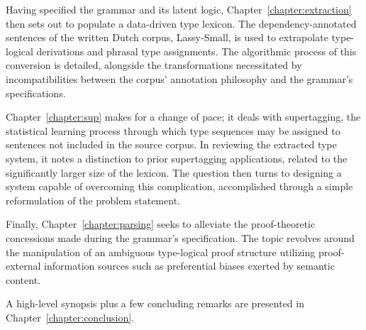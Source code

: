 Having specified the grammar and its latent logic, Chapter~\ref{chapter:extraction} then sets out to populate a data-driven type lexicon.
The dependency-annotated sentences of the written Dutch corpus, Lassy-Small, is used to extrapolate type-logical derivations and phrasal type assignments.
The algorithmic process of this conversion is detailed, alongside the transformations necessitated by incompatibilities between the corpus' annotation philosophy and the grammar's specifications.

Chapter~\ref{chapter:sup} makes for a change of pace; it deals with supertagging, the statistical learning process through which type sequences may be assigned to sentences not included in the source corpus.
In reviewing the extracted type system, it notes a distinction to prior supertagging applications, related to the significantly larger size of the lexicon.
The question then turns to designing a system capable of overcoming this complication, accomplished through a simple reformulation of the problem statement.

Finally, Chapter~\ref{chapter:parsing} seeks to alleviate the proof-theoretic concessions made during the grammar's specification.
The topic revolves around the manipulation of an ambiguous type-logical proof structure utilizing proof-external information sources such as preferential biases exerted by semantic content.

A high-level synopsis plus a few concluding remarks are presented in Chapter~\ref{chapter:conclusion}.